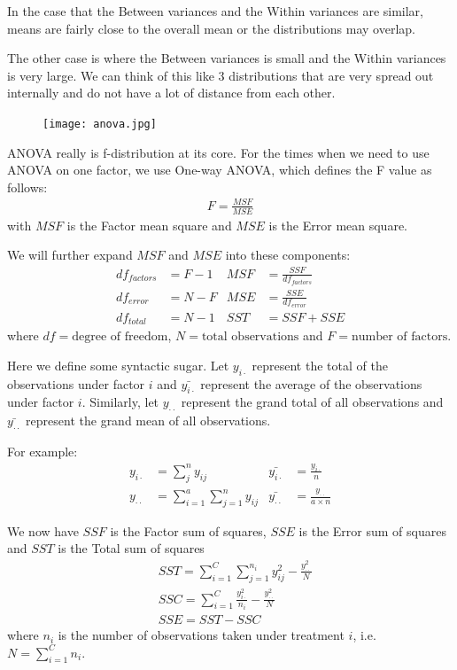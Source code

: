 \documentclass[a4paper]{article}
\numberwithin{equation}{section}
\begin{document}
In the case that the Between variances and the Within variances are similar, means are fairly close to the overall mean or the distributions may overlap.

The other case is where the Between variances is small and the Within variances is very large.
We can think of this like 3 distributions that are very spread out internally and do not have a lot of distance from each other.
\begin{figure}[H]
  \centering
  \texttt{[image: anova.jpg]}
\end{figure}

ANOVA really is f-distribution at its core.
For the times when we need to use ANOVA on one factor, we use One-way ANOVA, which defines the F value as follows:
\begin{align*}
  F = \frac{MSF}{MSE}
\end{align*}
with \(MSF\) is the Factor mean square and \(MSE\) is the Error mean square.

We will further expand \(MSF\) and \(MSE\) into these components:
\begin{align*}
  df_{factors} & = F - 1 & MSF & = \frac{SSF}{df_{factors}} \\
  df_{error}   & = N - F & MSE & = \frac{SSE}{df_{error}}   \\
  df_{total}   & = N - 1 & SST & = SSF + SSE
\end{align*}
where \(df = \text{degree of freedom}\), \(N = \text{total observations}\) and \(F = \text{number of factors}\).

Here we define some syntactic sugar. Let \(y_{i\cdot}\) represent the total of the observations under factor \(i\) and \(\bar{y_{i\cdot}}\) represent the average of the observations under factor \(i\).
Similarly, let \(y_{\cdot\cdot}\) represent the grand total of all observations and \(\bar{y_{\cdot\cdot}}\) represent the grand mean of all observations.

For example:
\begin{align*}
  y_{i\cdot}     & = \sum_{j}^{n} y_{ij}                  & \bar{y_{i\cdot}}     & = \frac{y_{i\cdot}}{n}              \\
  y_{\cdot\cdot} & = \sum_{i=1}^{a} \sum_{j=1}^{n} y_{ij} & \bar{y_{\cdot\cdot}} & = \frac{y_{\cdot\cdot}}{a \times n}
\end{align*}

We now have \(SSF\) is the Factor sum of squares, \(SSE\) is the Error sum of squares and \(SST\) is the Total sum of squares
\begin{align*}
   & SST = \sum_{i=1}^{C} \sum_{j=1}^{n_i} y_{ij}^2 - \frac{y_{\cdot\cdot}^2}{N}  \\
   & SSC = \sum_{i=1}^{C} \frac{y_{i\cdot}^{2}}{n_i} - \frac{y_{\cdot\cdot}^2}{N} \\
   & SSE = SST - SSC
\end{align*}
where \(n_i\) is the number of observations taken under treatment \(i\), i.e. \(N = \sum_{i=1}^{C} n_i\).
\end{document}
